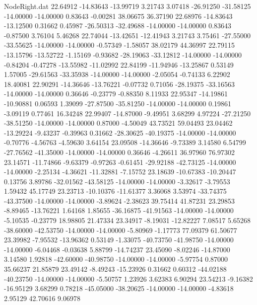 \begin{filecontents}{NodeRight.dat}
  22.64912  -14.83643  -13.99719     3.21743    3.07418  -26.91250  -31.58125  -14.00000  -14.00000    0.83643   -0.00281   38.06675   36.37190
  22.68976  -14.83643  -13.12500     0.31662    0.45987  -26.50313  -32.49688  -14.00000  -14.00000    0.83643   -0.87500    3.76104    5.46268
  22.74044  -13.42651  -12.41943     3.21743    3.75461  -27.55000  -33.55625  -14.00000  -14.00000   -0.57349   -1.58057   38.02179   44.36997
  22.79115  -13.15796  -13.52722    -1.15169   -0.93682  -28.19063  -33.12812  -14.00000  -14.00000   -0.84204   -0.47278  -13.55982  -11.02992
  22.84199  -11.94946  -13.25867     0.53149    1.57005  -29.61563  -33.35938  -14.00000  -14.00000   -2.05054   -0.74133    6.22902   18.40081
  22.90291  -14.36646  -13.76221    -0.07732    0.71056  -28.19375  -33.16563  -14.00000  -14.00000    0.36646   -0.23779   -0.88350    8.11933
  22.95347  -14.19861  -10.90881     0.06593    1.39099  -27.87500  -35.81250  -14.00000  -14.00000    0.19861   -3.09119    0.77461   16.34248
  22.99407  -14.87000   -9.49951     3.68299    4.97224  -27.21250  -38.51250  -14.00000  -14.00000    0.87000   -4.50049   43.73521   59.04493
  23.04462  -13.29224   -9.43237    -0.39963    0.31662  -28.30625  -40.19375  -14.00000  -14.00000   -0.70776   -4.56763   -4.59630    3.64154
  23.09508  -14.36646   -9.73389     3.14580    6.54799  -27.76562  -41.35000  -14.00000  -14.00000    0.36646   -4.26611   36.97960   76.97302
  23.14571  -11.74866   -9.63379    -0.97263   -0.61451  -29.92188  -42.73125  -14.00000  -14.00000   -2.25134   -4.36621  -11.32881   -7.15752
  23.18639  -10.67383  -10.20447     0.13756    3.89786  -32.01562  -43.58125  -14.00000  -14.00000   -3.32617   -3.79553    1.59432   45.17749
  23.23713  -10.10376  -11.61377     3.36068    3.53974  -33.74375  -43.37500  -14.00000  -14.00000   -3.89624   -2.38623   39.75414   41.87231
  23.29853   -8.89465  -13.76221     1.64168    1.85655  -36.16875  -41.91563  -14.00000  -14.00000   -5.10535   -0.23779   18.98805   21.47334
  23.34917   -8.19031  -12.82227     7.08517    5.65268  -38.60000  -42.53750  -14.00000  -14.00000   -5.80969   -1.17773   77.09379   61.50677
  23.39982   -7.95532  -13.96362     0.53149   -1.33075  -40.73750  -41.98750  -14.00000  -14.00000   -6.04468   -0.03638    5.88799  -14.74237
  23.45090   -8.02246  -14.87000     3.14580    1.92818  -42.60000  -40.98750  -14.00000  -14.00000   -5.97754    0.87000   35.66237   21.85879
  23.49142   -8.49243  -15.23926     0.31662    0.60312  -44.02188  -40.23750  -14.00000  -14.00000   -5.50757    1.23926    3.62383    6.90294
  23.54213   -9.16382  -16.95129     3.68299    0.78218  -45.05000  -38.20625  -14.00000  -14.00000   -4.83618    2.95129   42.70616    9.06978

\end{filecontents}
